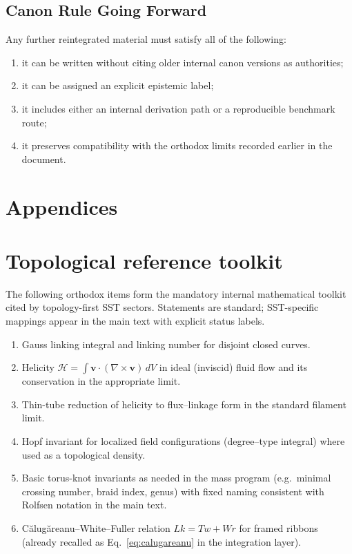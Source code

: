 \documentclass[11pt]{article}
\theoremstyle{definition}
\theoremstyle{plain}
\theoremstyle{remark}
\begin{document}
    \subsection{Canon Rule Going Forward}

        Any further reintegrated material must satisfy all of the following:
        \begin{enumerate}
            \item it can be written without citing older internal canon versions as authorities;
            \item it can be assigned an explicit epistemic label;
            \item it includes either an internal derivation path or a reproducible benchmark route;
            \item it preserves compatibility with the orthodox limits recorded earlier in the document.
        \end{enumerate}

\newpage
\section*{Appendices}
    \appendix

    \section{Topological reference toolkit}
        \label{sec:appendix_topology_toolkit}

        The following orthodox items form the mandatory internal mathematical toolkit cited by topology-first SST sectors. Statements are standard; SST-specific mappings appear in the main text with explicit status labels.

        \begin{enumerate}
            \item Gauss linking integral and linking number for disjoint closed curves.
            \item Helicity $\mathcal{H}=\int \mathbf{v}\cdot(\nabla\times\mathbf{v})\,dV$ in ideal (inviscid) fluid flow and its conservation in the appropriate limit.
            \item Thin-tube reduction of helicity to flux--linkage form in the standard filament limit.
            \item Hopf invariant for localized field configurations (degree--type integral) where used as a topological density.
            \item Basic torus-knot invariants as needed in the mass program (e.g.\ minimal crossing number, braid index, genus) with fixed naming consistent with Rolfsen notation in the main text.
            \item C\u{a}lug\u{a}reanu--White--Fuller relation $Lk=Tw+Wr$ for framed ribbons (already recalled as Eq.~\eqref{eq:calugareanu} in the integration layer).
        \end{enumerate}
\end{document}
